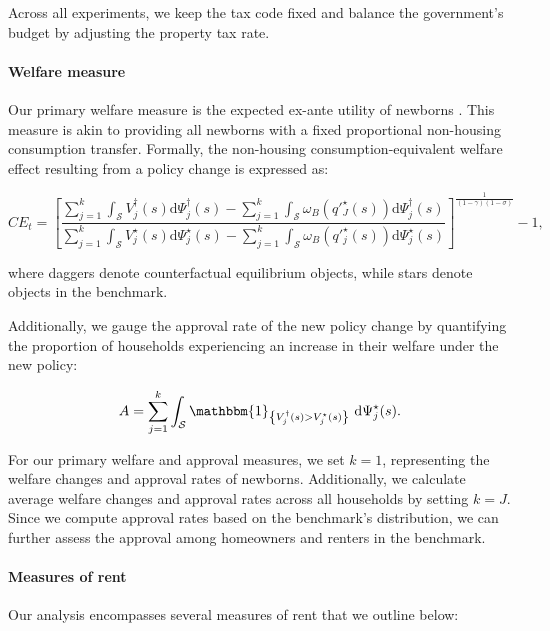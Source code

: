 \documentclass[parskip=full]{article}
\newcommand{\indicator}[1]{\mathbbm{1}_{\left\{ {#1} \right\} }}
\begin{document}
Across all experiments, we keep the tax code fixed and balance the government's budget by adjusting the property tax rate.

\paragraph{Welfare measure} Our primary welfare measure is the expected ex-ante utility of newborns \citep{ralws-1971,conesa-et-al,gkkoc}. This measure is akin to providing all newborns with a fixed proportional non-housing consumption transfer. Formally, the non-housing consumption-equivalent welfare effect resulting from a policy change is expressed as:

\begin{equation}
  CE_{t} = \left[\frac{\sum_{j=1}^{k}\int_{\mathcal{S}}V^{\dagger}_{j}(s)\mathrm{d}\Psi^{\dagger}_{j}(s)-\sum_{j=1}^{k}\int_{\mathcal{S}}\omega_{B}(q'^{\star}_{J}(s))\mathrm{d}\Psi^{\dagger}_{j}(s)}{\sum_{j=1}^{k}\int_{\mathcal{S}}V^{\star}_{j}(s)\mathrm{d}\Psi^{\star}_{j}(s)-\sum_{j=1}^{k}\int_{\mathcal{S}}\omega_{B}(q'^{\star}_{j}(s))\mathrm{d}\Psi^{\star}_{j}(s)}\right]^{\frac{1}{(1-\gamma)(1-\sigma)}}-1,
\end{equation}

\noindent where daggers denote counterfactual equilibrium objects, while stars denote objects in the benchmark. 

Additionally, we gauge the approval rate of the new policy change by quantifying the proportion of households experiencing an increase in their welfare under the new policy:

\begin{equation}
A = \sum_{j=1}^{k}\int_{\mathcal{S}} \indicator{V^{\dagger}_{j}(s)>V^{\star}_{j}(s)}\ \mathrm{d}\Psi^{\star}_{j}(s).
\end{equation}

\noindent For our primary welfare and approval measures, we set $k=1$, representing the welfare changes and approval rates of newborns. Additionally, we calculate average welfare changes and approval rates across all households by setting $k=J$. Since we compute approval rates based on the benchmark's distribution, we can further assess the approval among homeowners and renters in the benchmark.

\paragraph{Measures of rent} Our analysis encompasses several measures of rent that we outline below:
\end{document}
